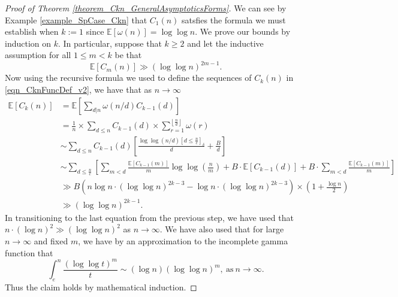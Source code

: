 \documentclass[11pt,reqno,a4letter]{article}
\numberwithin{figure}{section}
\numberwithin{table}{section}
\newcommand{\Iverson}[1]{\ensuremath{\left[#1\right]_{\delta}}}
\newcommand{\Floor}[2]{\ensuremath{\left\lfloor \frac{#1}{#2} \right\rfloor}}
\theoremstyle{plain}
\numberwithin{theorem}{section}
\theoremstyle{definition}
\newcommand{\NBRef}[1]{}
\begin{document}
\NBRef{A08-2020-04-26} 
\begin{proof}[Proof of Theorem \ref{theorem_Ckn_GeneralAsymptoticsForms}] 
\label{proofOf_theorem_Ckn_GeneralAsymptoticsForms} 
We can see by Example \ref{example_SpCase_Ckn} that $C_1(n)$ 
satsfies the formula we must establish when $k := 1$ since $\mathbb{E}[\omega(n)] = \log\log n$. 
We prove our bounds by induction on $k$. 
In particular, suppose that $k \geq 2$ and let the inductive assumption for all $1 \leq m < k$ 
be that 
\[
\mathbb{E}[C_m(n)] \gg (\log\log n)^{2m-1}. 
\] 
Now using the recursive formula we used to define the sequences of $C_k(n)$ in 
\eqref{eqn_CknFuncDef_v2}, we have that as $n \rightarrow \infty$ 
\begin{align*} 
\mathbb{E}[C_k(n)] & = \mathbb{E}\left[\sum_{d|n} \omega(n/d) C_{k-1}(d)\right] \\ 
     & = \frac{1}{n} \times \sum_{d \leq n} C_{k-1}(d) \times \sum_{r=1}^{\Floor{n}{d}} \omega(r) \\ 
     & \sim \sum_{d \leq n} C_{k-1}(d) \left[ 
     \frac{\log\log(n/d) \Iverson{d \leq \frac{n}{e}}}{d} + \frac{B}{d}\right] \\ 
     & \sim \sum_{d \leq \frac{n}{e}} \left[ 
     \sum_{m < d} \frac{\mathbb{E}[C_{k-1}(m)]}{m} \log\log\left(\frac{n}{m}\right) + 
     B \cdot \mathbb{E}[C_{k-1}(d)] + B \cdot \sum_{m < d} \frac{\mathbb{E}[C_{k-1}(m)]}{m} 
     \right] \\ 
     & \gg B \left(n \log n \cdot (\log\log n)^{2k-3} - \log n \cdot (\log\log n)^{2k-3}\right) \times 
     \left(1 + \frac{\log n}{2}\right) \\ 
     & \gg (\log\log n)^{2k-1}. 
\end{align*} 
In transitioning to the last equation from the previous step, we have used that 
$n \cdot (\log n)^2 \gg (\log\log n)^2$ as $n \rightarrow \infty$. We have also used that for large 
$n \rightarrow \infty$ and fixed $m$, we have by an approximation to the incomplete gamma function that 
\[
\int_{e}^{n} \frac{(\log\log t)^m}{t} \sim (\log n) (\log\log n)^{m}, 
     \mathrm{\ as\ } n \rightarrow \infty. 
\]
Thus the claim holds by mathematical induction. 
\end{proof} 
\end{document}
